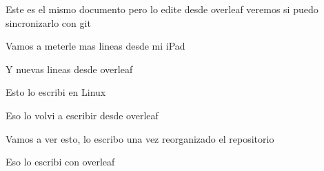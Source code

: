\documentclass{article}
\begin{document}
	Este  es el mismo documento pero lo edite desde overleaf veremos si  puedo sincronizarlo con git
	
Vamos a meterle mas lineas desde mi iPad

Y nuevas lineas desde overleaf

Esto lo escribi en Linux


Eso lo volvi a escribir desde overleaf

Vamos a ver esto, lo escribo una vez reorganizado el repositorio

Eso lo escribi con overleaf



 
\end{document}
